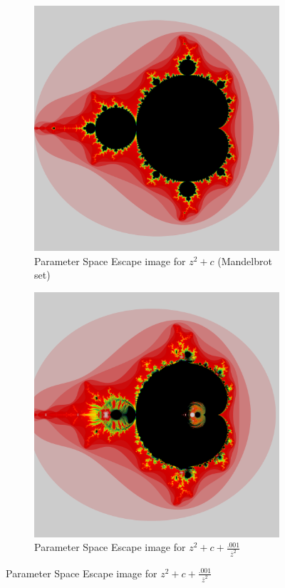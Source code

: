 \begin{figure}[h]
	\centering
	\begin{subfigure}[b]{0.4\textwidth}
			\includegraphics[width=\textwidth]{./img/b000}
			\caption{Parameter Space Escape image for $z^2 + c$ (Mandelbrot set)}
			\label{stande}%
	\end{subfigure}
	\begin{subfigure}[b]{0.4\textwidth}
			\includegraphics[width=\textwidth]{./img/b001}
			\caption{Parameter Space Escape image for $z^2 + c + \frac{.001}{\overline{z}^2}$}
			\label{perte}
	\end{subfigure}%


\end{figure}
